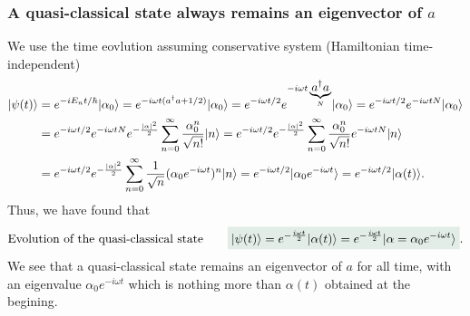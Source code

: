 \subsubsection{A quasi-classical state always remains an eigenvector of $a$}
We use the time eovlution assuming conservative system (Hamiltonian time-independent)
\begin{align*}
    |\psi(t)\rangle&=e^{-iE_nt/\hbar}|\alpha_0\rangle=e^{-i\omega t(a^\dagger a+1/2)}|\alpha_0\rangle=e^{-i\omega t/2}e^{-i\omega t \underbrace{a^\dagger a}_{N}}|\alpha_0\rangle=e^{-i\omega t/2}e^{-i\omega tN}|\alpha_0\rangle\\
    &=e^{-i\omega t/2}e^{-i\omega tN}e^{-\frac{|\alpha|^2}{2}}\sum_{n=0}^\infty\frac{\alpha_0^n}{\sqrt{n!}}|n\rangle=e^{-i\omega t/2}e^{-\frac{|\alpha|^2}{2}}\sum_{n=0}^\infty\frac{\alpha_0^n}{\sqrt{n!}}e^{-i\omega tN}|n\rangle\\
    &=e^{-i\omega t/2}e^{-\frac{|\alpha|^2}{2}}\sum_{n=0}^\infty\frac{1}{\sqrt{n}}(\alpha_0e^{-i\omega t})^n|n\rangle=e^{-i\omega t/2}|\alpha_0e^{-i\omega t}\rangle=e^{-i\omega t/2}|\alpha(t)\rangle.
\end{align*} 
Thus, we have found that 
\begin{align}
    \text{Evolution of the quasi-classical state}\qquad\highlight{\ket{\psi(t)}=e^{-\frac{i\omega t}{2}}\ket{\alpha(t)}=e^{-\frac{i\omega t}{2}}\ket{\alpha=\alpha_0e^{-i\omega t}}}.
    \label{eq:evolcoherentstate}
\end{align}
We see that a quasi-classical state remains an eigenvector of $a$ for all time, with an eigenvalue $\alpha_0e^{-i\omega t}$ which is nothing more than $\alpha(t)$ obtained at the begining.
%
